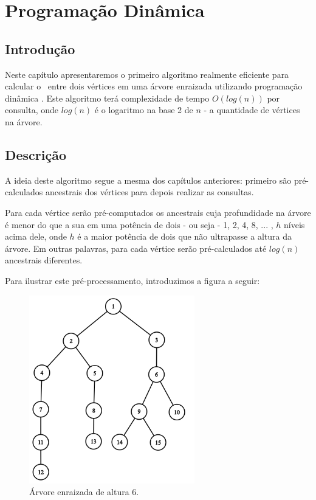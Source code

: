 \chapter{Programação Dinâmica}
\label{cap:programacao-dinamica}

\section{Introdução}

Neste capítulo apresentaremos o primeiro algoritmo realmente eficiente para calcular o \LCA\ entre dois vértices em uma árvore enraizada utilizando programação dinâmica \cite{programacao-dinamica}. Este algoritmo terá complexidade de tempo $O(log(n))$ por consulta, onde $log(n)$ é o logaritmo na base 2 de $n$ - a quantidade de vértices na árvore.

\section{Descrição}

A ideia deste algoritmo segue a mesma dos capítulos anteriores: primeiro são pré-calculados ancestrais dos vértices para depois realizar as consultas.

Para cada vértice serão pré-computados os ancestrais cuja profundidade na árvore é menor do que a sua em uma potência de dois - ou seja - 1, 2, 4, 8, ... , $h$ níveis acima dele, onde $h$ é a maior potência de dois que não ultrapasse a altura da árvore. Em outras palavras, para cada vértice serão pré-calculados até $log(n)$ ancestrais diferentes.

Para ilustrar este pré-processamento, introduzimos a figura a seguir:

\begin{figure}[htb]
\begin{center}
\includegraphics[width=7.2cm]{images/graph_dp.png}
\end{center}
\caption{\label{fig:arvore-6}Árvore enraizada de altura 6.}
\end{figure}


